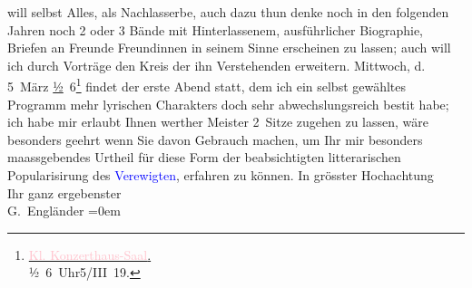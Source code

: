                     will selbst Alles, als Nachlasserbe, auch dazu thun {\kaufmannsund} denke noch in den folgenden Jahren noch 2 oder 3 {\pb}Bände mit Hinterlassenem, ausführlicher
                    Biographie, Briefen an Freunde {\kaufmannsund} Freundinnen in
                    seinem Sinne erscheinen zu lassen; auch will ich durch Vorträge den Kreis der
                    ihn Verstehenden erweitern.\pend
           \pstart
           Mittwoch, d. 5 März{ }\uline{½} 6\footnote{\noindent{}\uline{\textcolor{pink}{Kl.
                                Konzerthaus-Saal}.}{\\}½ 6 Uhr\hspace*{1em}5/III 19.} findet der erste Abend statt, dem ich ein selbst gewähltes Programm
                    mehr lyrischen Charakters {\kaufmannsund} doch sehr
                    abwechslungsreich besti{\geminationm}t habe; ich habe mir
                    erlaubt Ihnen werther Meister 2 Sitze zugehen zu lassen, wäre besonders
                    geehrt wenn Sie davon Gebrauch machen, um Ihr mir besonders maassgebendes
                    Urtheil für diese Form der beabsichtigten litterarischen Popularisirung des \textcolor{blue}{Verewigten}{}, erfahren zu
                    können.\pend
           \pstart
           In grösster Hochachtung{\\[\baselineskip]}Ihr ganz ergebenster{\\[\baselineskip]}\spacefill\mbox{G.
                        Engländer}\pend
           \leftskip=0em{}\endnumbering{}  
      